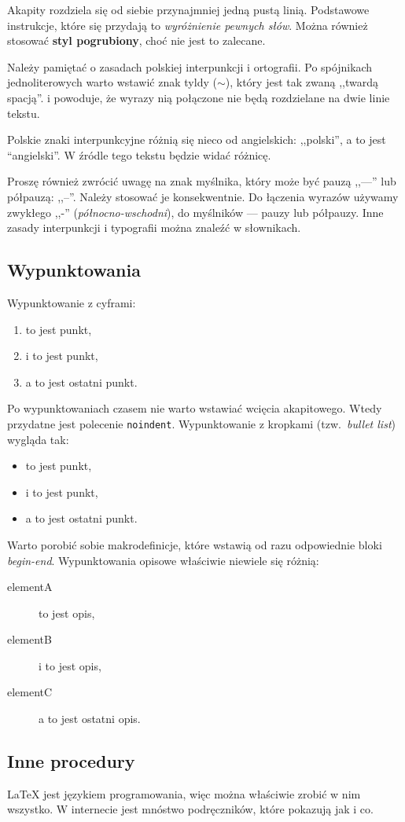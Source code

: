Akapity rozdziela się od siebie przynajmniej jedną pustą linią. Podstawowe
instrukcje, które się przydają to \emph{wyróżnienie pewnych słów}. Można również
stosować \textbf{styl pogrubiony}, choć nie jest to zalecane.

Należy pamiętać o zasadach polskiej interpunkcji i ortografii. Po spójnikach 
jednoliterowych warto wstawić znak tyldy ($\sim$), który jest tak zwaną
,,twardą spacją''. i powoduje, że wyrazy nią połączone nie będą rozdzielane
na dwie linie tekstu.

Polskie znaki interpunkcyjne różnią się nieco od angielskich: ,,polski'', a to jest
``angielski''. W źródle tego tekstu będzie widać różnicę.

Proszę również zwrócić uwagę na znak myślnika, który może być pauzą ,,---'' lub
półpauzą: ,,--''. Należy stosować je konsekwentnie. Do łączenia wyrazów używamy
zwykłego ,,-'' (\emph{północno-wschodni}), do myślników --- pauzy lub półpauzy.
Inne zasady interpunkcji i typografii można znaleźć w słownikach.



\subsection{Wypunktowania}

Wypunktowanie z cyframi:
\begin{enumerate}
    \item to jest punkt,
    \item i to jest punkt,
    \item a to jest ostatni punkt.
\end{enumerate}

\noindent
Po wypunktowaniach czasem nie warto wstawiać wcięcia akapitowego. Wtedy przydatne jest
polecenie \texttt{noindent}. Wypunktowanie z kropkami (tzw.~\emph{bullet list}) wygląda tak:
\begin{itemize}
    \item to jest punkt,
    \item i to jest punkt,
    \item a to jest ostatni punkt.
\end{itemize}

\noindent
Warto porobić sobie makrodefinicje, które wstawią od razu odpowiednie bloki
\emph{begin-end}. Wypunktowania opisowe właściwie niewiele się różnią:
\begin{description}
    \item[elementA] to jest opis,
    \item[elementB] i to jest opis,
    \item[elementC] a to jest ostatni opis.
\end{description}



\subsection{Inne procedury}

\LaTeX{} jest językiem programowania, więc można właściwie zrobić w nim wszystko.
W internecie jest mnóstwo podręczników, które pokazują jak i co.

